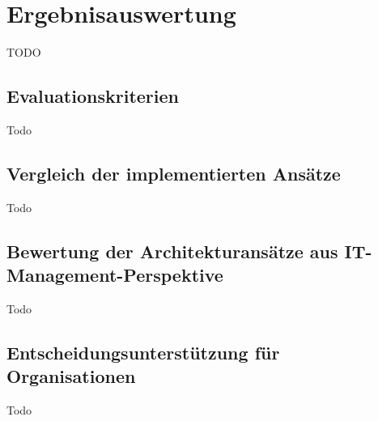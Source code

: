 \section{Ergebnisauswertung}
TODO

\subsection{Evaluationskriterien}
Todo

\subsection{Vergleich der implementierten Ansätze}
Todo

\subsection{Bewertung der Architekturansätze aus IT-Management-Perspektive}
Todo

\subsection{Entscheidungsunterstützung für Organisationen}
Todo
